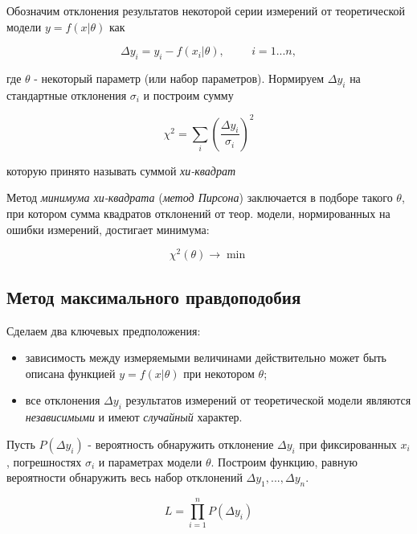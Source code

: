 \documentclass[12pt]{article}
\begin{document}
      Обозначим отклонения результатов некоторой серии измерений от теоретической модели
      $y = f(x | \theta)$ как

      $$
        \Delta y_i = y_i - f(x_i | \theta), \hspace{1cm} i = 1...n,
      $$

      где $\theta$ - некоторый параметр (или набор параметров). Нормируем $\Delta y_i$
      на стандартные отклонения $\sigma_i$ и построим сумму

      \begin{equation}
        \chi^2 = \sum_{i} \left( \frac{\Delta y_i}{\sigma_i} \right)^2
      \end{equation}

      которую принято называть суммой \textit{хи-квадрат}

      Метод \textit{минимума хи-квадрата} (\textit{метод Пирсона}) заключается в подборе
      такого $\theta$, при котором сумма квадратов отклонений от теор. модели,
      нормированных на ошибки измерений, достигает минимума:

      $$
        \chi^2 (\theta) \rightarrow \min
      $$

    \subsection{Метод максимального правдоподобия}

      Сделаем два ключевых предположения:

      \begin{itemize}

        \item зависимость между измеряемыми величинами действительно может быть
        описана функцией $y = f(x|\theta)$ при некотором $\theta$;

        \item все отклонения $\Delta y_i$ результатов измерений от теоретической модели
        являются \textit{независимыми} и имеют \textit{случайный} характер.

      \end{itemize}

      Пусть $P(\Delta y_i)$ - вероятность обнаружить отклонение $\Delta y_i$ при фиксированных
      ${x_i}$, погрешностях ${\sigma_i}$ и параметрах модели $\theta$. Построим функцию,
      равную вероятности обнаружить весь набор отклонений ${\Delta y_1, ..., \Delta y_n}$.

      \begin{equation}
        L = \prod \limits_{i=1}^n P(\Delta y_i)
      \end{equation}
\end{document}
